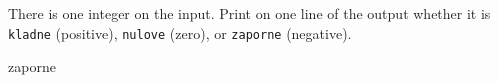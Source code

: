 




There is one integer on the input. Print on one line of the output whether it is \texttt{kladne} (positive),
\texttt{nulove} (zero), or \texttt{zaporne} (negative).

\vystup
zaporne
\koniec

